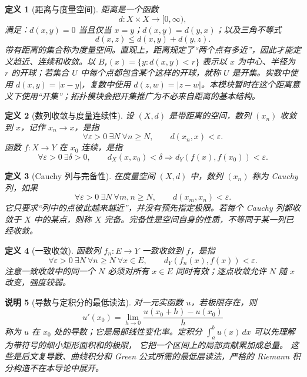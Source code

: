 \documentclass[UTF8,fontset=none,a4paper,11pt]{ctexart}
\theoremstyle{foundation-definition}
\newtheorem{definition}{定义}[section]
\theoremstyle{foundation-theorem}
\theoremstyle{foundation-proposition}
\theoremstyle{foundation-example}
\theoremstyle{foundation-remark}
\newtheorem{remark}[definition]{说明}
\theoremstyle{foundation-theorem}
\begin{document}
\begin{definition}[距离与度量空间]\label{def:metric-space}
距离是一个函数
\[
d:X\times X\longrightarrow[0,\infty),
\]
满足：\(d(x,y)=0\) 当且仅当 \(x=y\)；\(d(x,y)=d(y,x)\)；以及三角不等式
\[
d(x,z)\leq d(x,y)+d(y,z).
\]
带有距离的集合称为度量空间。直观上，距离规定了“两个点有多近”，因此才能定义趋近、连续和收敛。以 \(B_r(x)=\{y:d(x,y)<r\}\) 表示以 \(x\) 为中心、半径为 \(r\) 的开球；若集合 \(U\) 中每个点都包含某个这样的开球，就称 \(U\) 是开集。实数中使用 \(d(x,y)=|x-y|\)，复数中使用 \(d(z,w)=|z-w|\)。本模块暂时在这个距离意义下使用“开集”；拓扑模块会把开集推广为不必来自距离的基本结构。
\end{definition}

\begin{definition}[数列收敛与度量连续性]\label{def:analysis-foundations}
设 \((X,d)\) 是带距离的空间，数列 \((x_n)\) 收敛到 \(x\)，记作 \(x_n\to x\)，是指
\[
\forall\varepsilon>0\ \exists N\ \forall n\geq N,
\qquad d(x_n,x)<\varepsilon.
\]
函数 \(f:X\to Y\) 在 \(x_0\) 连续，是指
\[
\forall\varepsilon>0\ \exists\delta>0,\qquad
d_X(x,x_0)<\delta\Longrightarrow d_Y(f(x),f(x_0))<\varepsilon.
\]
\end{definition}

\begin{definition}[Cauchy 列与完备性]\label{def:cauchy-complete}
在度量空间 \((X,d)\) 中，数列 \((x_n)\) 称为 Cauchy 列，如果
\[
\forall\varepsilon>0\ \exists N\ \forall m,n\geq N,\qquad
d(x_m,x_n)<\varepsilon.
\]
它只要求“列中的点彼此越来越近”，并没有预先指定极限。若每个 Cauchy 列都收敛于 \(X\)
中的某点，则称 \(X\) 完备。完备性是空间自身的性质，不等同于某一列已经收敛。
\end{definition}

\begin{definition}[一致收敛]\label{def:uniform-convergence}
函数列 \(f_n:E\to Y\) 一致收敛到 \(f\)，是指
\[
\forall\varepsilon>0\ \exists N\ \forall n\geq N\ \forall x\in E,
\qquad d_Y(f_n(x),f(x))<\varepsilon.
\]
注意一致收敛中的同一个 \(N\) 必须对所有 \(x\in E\) 同时有效；逐点收敛允许 \(N\) 随 \(x\) 改变，强度较弱。
\end{definition}

\begin{remark}[导数与定积分的最低读法]
对一元实函数 \(u\)，若极限存在，则
\[
u'(x_0)=\lim_{h\to0}\frac{u(x_0+h)-u(x_0)}{h}
\]
称为 \(u\) 在 \(x_0\) 处的导数；它是局部线性变化率。定积分
\(\int_a^b u(x)\,dx\) 可以先理解为带符号的细小矩形面积和的极限，
它把一个区间上的局部贡献累加成总量。
这些是后文复导数、曲线积分和 Green 公式所需的最低层读法，严格的
Riemann 积分构造不在本导论中展开。
\end{remark}
\end{document}
